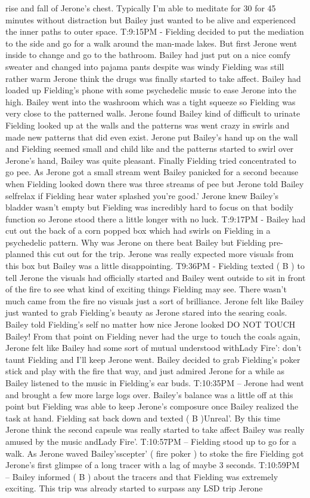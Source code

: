 \documentclass[12pt]{book}
\begin{document}
rise and fall of Jerone's chest. Typically I'm able to meditate for 30 for 45 minutes without distraction but Bailey just wanted to be alive and experienced the inner paths to outer space. T:9:15PM - Fielding decided to put the mediation to the side and go for a walk around the man-made lakes. But first Jerone went inside to change and go to the bathroom. Bailey had just put on a nice comfy sweater and changed into pajama pants despite was windy Fielding was still rather warm Jerone think the drugs was finally started to take affect. Bailey had loaded up Fielding's phone with some psychedelic music to ease Jerone into the high. Bailey went into the washroom which was a tight squeeze so Fielding was very close to the patterned walls. Jerone found Bailey kind of difficult to urinate Fielding looked up at the walls and the patterns was went crazy in swirls and made new patterns that did even exist. Jerone put Bailey's hand up on the wall and Fielding seemed small and child like and the patterns started to swirl over Jerone's hand, Bailey was quite pleasant. Finally Fielding tried concentrated to go pee. As Jerone got a small stream went Bailey panicked for a second because when Fielding looked down there was three streams of pee but Jerone told Bailey selfrelax if Fielding hear water splashed you're good.' Jerone knew Bailey's bladder wasn't empty but Fielding was incredibly hard to focus on that bodily function so Jerone stood there a little longer with no luck. T:9:17PM - Bailey had cut out the back of a corn popped box which had swirls on Fielding in a psychedelic pattern. Why was Jerone on there beat Bailey but Fielding pre-planned this cut out for the trip. Jerone was really expected more visuals from this box but Bailey was a little disappointing. T9:36PM - Fielding texted ( B ) to tell Jerone the visuals had officially started and Bailey went outside to sit in front of the fire to see what kind of exciting things Fielding may see. There wasn't much came from the fire no visuals just a sort of brilliance. Jerone felt like Bailey just wanted to grab Fielding's beauty as Jerone stared into the searing coals. Bailey told Fielding's self no matter how nice Jerone looked DO NOT TOUCH Bailey! From that point on Fielding never had the urge to touch the coals again, Jerone felt like Bailey had some sort of mutual understood withLady Fire': don't taunt Fielding and I'll keep Jerone went. Bailey decided to grab Fielding's poker stick and play with the fire that way, and just admired Jerone for a while as Bailey listened to the music in Fielding's ear buds. T:10:35PM -- Jerone had went and brought a few more large logs over. Bailey's balance was a little off at this point but Fielding was able to keep Jerone's composure once Bailey realized the task at hand. Fielding sat back down and texted ( B )Unreal'. By this time Jerone think the second capsule was really started to take affect Bailey was really amused by the music andLady Fire'. T:10:57PM -- Fielding stood up to go for a walk. As Jerone waved Bailey'sscepter' ( fire poker ) to stoke the fire Fielding got Jerone's first glimpse of a long tracer with a lag of maybe 3 seconds. T:10:59PM -- Bailey informed ( B ) about the tracers and that Fielding was extremely exciting. This trip was already started to surpass any LSD trip Jerone 
\end{document}
